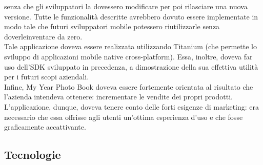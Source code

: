 				senza che gli sviluppatori la dovessero modificare per poi rilasciare una nuova versione. Tutte le funzionalità
				descritte avrebbero dovuto essere implementate in modo tale che futuri sviluppatori mobile potessero riutilizzarle  
				senza doverleinventare da zero.\\
				Tale applicazione doveva essere realizzata utilizzando Titanium (che permette lo sviluppo di applicazioni mobile
				native cross-platform). Essa, inoltre, doveva far uso dell'SDK sviluppato in precedenza, a dimostrazione della sua
				effettiva utilità per i futuri scopi aziendali.\\
				Infine, My Year Photo Book doveva essere fortemente orientata al risultato che l'azienda intendeva ottenere:
				incrementare le vendite dei propri prodotti. L'applicazione, dunque, doveva tenere conto delle forti esigenze di
				marketing: era necessario che essa offrisse agli utenti un'ottima esperienza d'uso e che fosse graficamente
				accattivante.
		\subsection{Tecnologie}

